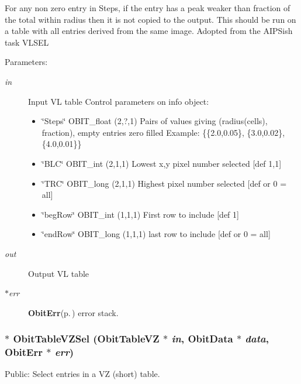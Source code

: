 For any non zero entry in Steps, if the entry has a peak weaker than fraction of the total within radius then it is not copied to the output. This should be run on a table with all entries derived from the same image. Adopted from the AIPSish task VLSEL \begin{Desc}
\item[Parameters:]
\begin{description}
\item[{\em in}]Input VL table Control parameters on info object: \begin{itemize}
\item \char`\"{}Steps\char`\"{} OBIT\_\-float (2,?,1) Pairs of values giving (radius(cells), fraction), empty entries zero filled Example: \{\{2.0,0.05\}, \{3.0,0.02\}, \{4.0,0.01\}\} \item \char`\"{}BLC\char`\"{} OBIT\_\-int (2,1,1) Lowest x,y pixel number selected [def 1,1] \item \char`\"{}TRC\char`\"{} OBIT\_\-long (2,1,1) Highest pixel number selected [def or 0 = all] \item \char`\"{}beg\-Row\char`\"{} OBIT\_\-int (1,1,1) First row to include [def 1] \item \char`\"{}end\-Row\char`\"{} OBIT\_\-long (1,1,1) last row to include [def or 0 = all] \end{itemize}
\item[{\em out}]Output VL table \item[{\em $\ast$err}]{\bf Obit\-Err}{\rm (p.\,\pageref{structObitErr})} error stack. \end{description}
\end{Desc}
\subsubsection{$\ast$ Obit\-Table\-VZSel ({\bf Obit\-Table\-VZ} $\ast$ {\em in}, {\bf Obit\-Data} $\ast$ {\em data}, {\bf Obit\-Err} $\ast$ {\em err})}\label{ObitTableVLUtil_8h_a9}


Public: Select entries in a VZ (short) table. 

